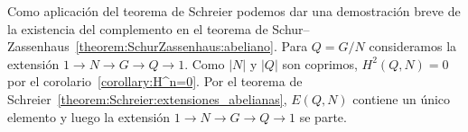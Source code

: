 Como aplicación del teorema de Schreier podemos dar una demostración breve
de la existencia del complemento en el teorema de
Schur--Zassenhaus~\ref{theorem:SchurZassenhaus:abeliano}.  Para $Q=G/N$
consideramos la extensión $1\to N\to G\to Q\to 1$. Como $|N|$ y $|Q|$ son
coprimos, $H^2(Q,N)=0$ por el corolario~\ref{corollary:H^n=0}.  Por el
teorema de Schreier~\ref{theorem:Schreier:extensiones_abelianas}, $E(Q,N)$
contiene un único elemento y luego la extensión $1\to N\to G\to Q\to 1$ se
parte.


%
%
%
%
%	
%
%
%
%
%

